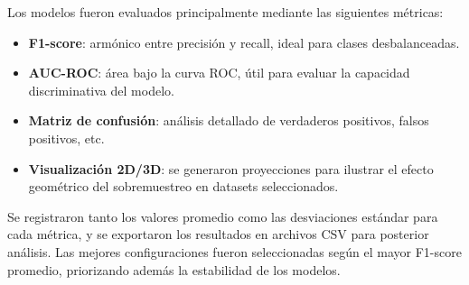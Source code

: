 Los modelos fueron evaluados principalmente mediante las siguientes métricas:

\begin{itemize}
  \item \textbf{F1-score}: armónico entre precisión y recall, ideal para clases desbalanceadas.
  \item \textbf{AUC-ROC}: área bajo la curva ROC, útil para evaluar la capacidad discriminativa del modelo.
  \item \textbf{Matriz de confusión}: análisis detallado de verdaderos positivos, falsos positivos, etc.
  \item \textbf{Visualización 2D/3D}: se generaron proyecciones para ilustrar el efecto geométrico del sobremuestreo en datasets seleccionados.
\end{itemize}

Se registraron tanto los valores promedio como las desviaciones estándar para cada métrica, y se exportaron los resultados en archivos CSV para posterior análisis. Las mejores configuraciones fueron seleccionadas según el mayor F1-score promedio, priorizando además la estabilidad de los modelos.
